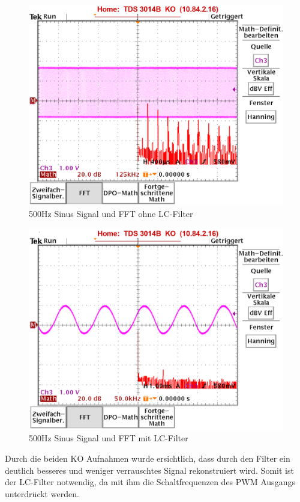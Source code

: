 \begin{figure}[H]
	\begin{center}
		\includegraphics[width=120mm]{data/500Hz_Sin_ohne_Filter_FFT.png}
		\caption[500Hz Sinus Signal und FFT ohne LC-Filter]{500Hz Sinus Signal und FFT ohne LC-Filter} %
		\label{fig:500Hz ohne Filter}
	\end{center}
\end{figure}

\begin{figure}[H]
	\begin{center}
		\includegraphics[width=120mm]{data/500Hz_Sin_mit_Filter_FFT.png}
		\caption[500Hz Sinus Signal und FFT mit LC-Filter]{500Hz Sinus Signal und FFT mit LC-Filter} %
		\label{fig:500Hz mit Filter}
	\end{center}
\end{figure}

Durch die beiden KO Aufnahmen wurde ersichtlich, dass durch den Filter ein deutlich besseres und weniger verrauschtes Signal rekonstruiert wird. Somit ist der LC-Filter notwendig, da mit ihm die Schaltfrequenzen des PWM Ausgangs unterdrückt werden.

